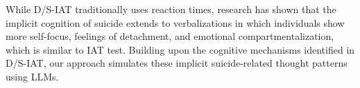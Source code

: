 While D/S-IAT traditionally uses reaction times, research \cite{suicide1, method3, method4} has shown that the implicit cognition of suicide extends to verbalizations in which individuals show more self-focus, feelings of detachment, and emotional compartmentalization, which is similar to IAT test. Building upon the cognitive mechanisms identified in D/S-IAT,  our approach simulates these implicit suicide-related thought patterns using LLMs. 





